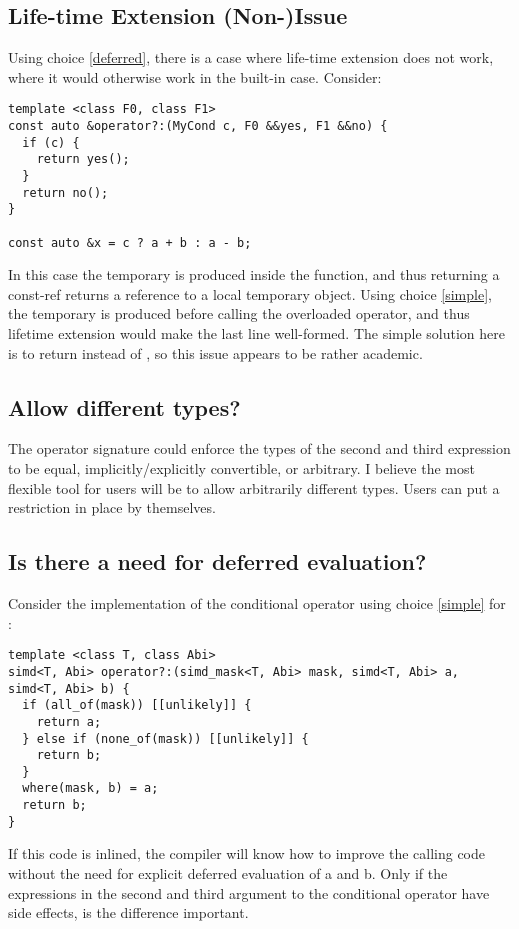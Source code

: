 \subsection{Life-time Extension (Non-)Issue}
Using choice \ref{deferred}, there is a case where life-time extension does not work, where it would otherwise work in the built-in case.
Consider:
\smallskip\begin{lstlisting}[style=Vc]
template <class F0, class F1>
const auto &operator?:(MyCond c, F0 &&yes, F1 &&no) {
  if (c) {
    return yes();
  }
  return no();
}

const auto &x = c ? a + b : a - b;
\end{lstlisting}
In this case the temporary is produced inside the  function, and thus returning a const-ref returns a reference to a local temporary object.
Using choice \ref{simple}, the temporary is produced before calling the overloaded operator, and thus lifetime extension would make the last line well-formed.
The simple solution here is to return  instead of , so this issue appears to be rather academic.

\subsection{Allow different types?}
The operator signature could enforce the types of the second and third expression to be equal, implicitly/explicitly convertible, or arbitrary.
I believe the most flexible tool for users will be to allow arbitrarily different types.
Users can put a restriction in place by themselves.

\subsection{Is there a need for deferred evaluation?}
Consider the implementation of the conditional operator using choice \ref{simple} for :
\smallskip\begin{lstlisting}[style=Vc]
template <class T, class Abi>
simd<T, Abi> operator?:(simd_mask<T, Abi> mask, simd<T, Abi> a, simd<T, Abi> b) {
  if (all_of(mask)) [[unlikely]] {
    return a;
  } else if (none_of(mask)) [[unlikely]] {
    return b;
  }
  where(mask, b) = a;
  return b;
}
\end{lstlisting}
If this code is inlined, the compiler will know how to improve the calling code without the need for explicit deferred evaluation of \code a and \code b.
Only if the expressions in the second and third argument to the conditional operator have side effects, is the difference important.


